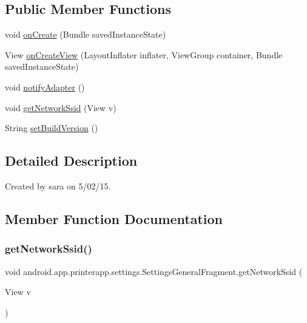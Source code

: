 \subsection*{Public Member Functions}
\begin{DoxyCompactItemize}
\item 
void \hyperlink{classandroid_1_1app_1_1printerapp_1_1settings_1_1_settings_general_fragment_a4ebd8a5d22c7f2e5975f95aa9b60849f}{on\+Create} (Bundle saved\+Instance\+State)
\item 
View \hyperlink{classandroid_1_1app_1_1printerapp_1_1settings_1_1_settings_general_fragment_aaecbed01d11d9184cc4e07b0bf5264ab}{on\+Create\+View} (Layout\+Inflater inflater, View\+Group container, Bundle saved\+Instance\+State)
\item 
void \hyperlink{classandroid_1_1app_1_1printerapp_1_1settings_1_1_settings_general_fragment_a4f794db8a1c7160e5e36d9ba56d80a2d}{notify\+Adapter} ()
\item 
void \hyperlink{classandroid_1_1app_1_1printerapp_1_1settings_1_1_settings_general_fragment_af9e92c82f4a03403188d85598984f033}{get\+Network\+Ssid} (View v)
\item 
String \hyperlink{classandroid_1_1app_1_1printerapp_1_1settings_1_1_settings_general_fragment_a60cc1b54a6bc360195c95adec2bddaf8}{set\+Build\+Version} ()
\end{DoxyCompactItemize}


\subsection{Detailed Description}
Created by sara on 5/02/15. 

\subsection{Member Function Documentation}
\mbox{\label{classandroid_1_1app_1_1printerapp_1_1settings_1_1_settings_general_fragment_af9e92c82f4a03403188d85598984f033}} 
\subsubsection{\texorpdfstring{get\+Network\+Ssid()}{getNetworkSsid()}}
{\footnotesize\ttfamily void android.\+app.\+printerapp.\+settings.\+Settings\+General\+Fragment.\+get\+Network\+Ssid (\begin{DoxyParamCaption}\item[{View}]{v }\end{DoxyParamCaption})}

